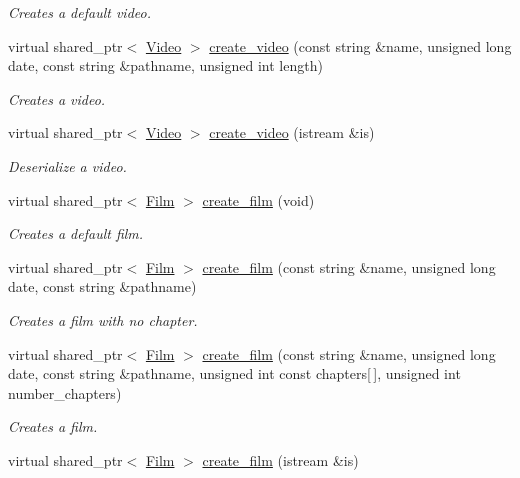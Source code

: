 \begin{DoxyCompactItemize}
\begin{DoxyCompactList}\small\item\em Creates a default video. \end{DoxyCompactList}\item 
virtual shared\-\_\-ptr$<$ \hyperlink{class_video}{Video} $>$ \hyperlink{class_multimedia_manager_a3d5cbae8789ee6576da1b92a6a136725}{create\-\_\-video} (const string \&name, unsigned long date, const string \&pathname, unsigned int length)
\begin{DoxyCompactList}\small\item\em Creates a video. \end{DoxyCompactList}\item 
virtual shared\-\_\-ptr$<$ \hyperlink{class_video}{Video} $>$ \hyperlink{class_multimedia_manager_ab0737cc478f5060c9da0a33762f2f34c}{create\-\_\-video} (istream \&is)
\begin{DoxyCompactList}\small\item\em Deserialize a video. \end{DoxyCompactList}\item 
virtual shared\-\_\-ptr$<$ \hyperlink{class_film}{Film} $>$ \hyperlink{class_multimedia_manager_af33b0c0a9adde3856d783d7ca99d9267}{create\-\_\-film} (void)
\begin{DoxyCompactList}\small\item\em Creates a default film. \end{DoxyCompactList}\item 
virtual shared\-\_\-ptr$<$ \hyperlink{class_film}{Film} $>$ \hyperlink{class_multimedia_manager_a433256dd37e58487f960558bcd8cb8fc}{create\-\_\-film} (const string \&name, unsigned long date, const string \&pathname)
\begin{DoxyCompactList}\small\item\em Creates a film with no chapter. \end{DoxyCompactList}\item 
virtual shared\-\_\-ptr$<$ \hyperlink{class_film}{Film} $>$ \hyperlink{class_multimedia_manager_a6437bb9bed0f47caa5f838ae7d9e972c}{create\-\_\-film} (const string \&name, unsigned long date, const string \&pathname, unsigned int const chapters\mbox{[}$\,$\mbox{]}, unsigned int number\-\_\-chapters)
\begin{DoxyCompactList}\small\item\em Creates a film. \end{DoxyCompactList}\item 
virtual shared\-\_\-ptr$<$ \hyperlink{class_film}{Film} $>$ \hyperlink{class_multimedia_manager_afff770e7acd58cf182ed1ec0901ed69b}{create\-\_\-film} (istream \&is)

\end{DoxyCompactItemize}
